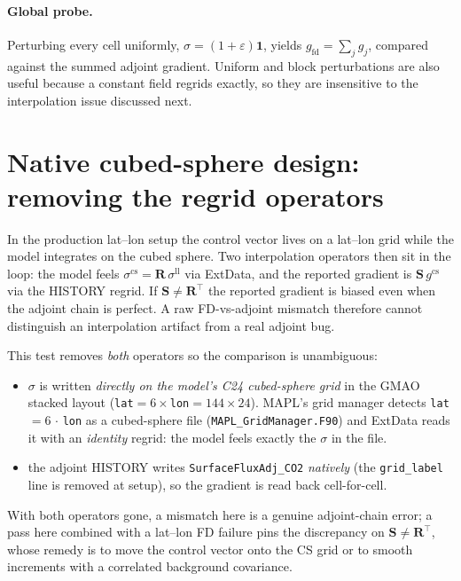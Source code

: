 \documentclass[12pt]{article}
\newcommand{\bm}[1]{\mathbf{#1}}
\newcommand{\gfit}{g_{\mathrm{fd}}}
\newcommand{\Robs}{\bm{R}}
\newcommand{\Sobs}{\bm{S}}
\begin{document}
\paragraph{Global probe.} Perturbing every cell uniformly,
$\sigma = (1+\varepsilon)\bm{1}$, yields $\gfit = \sum_j g_j$, compared against the
summed adjoint gradient. Uniform and block perturbations are also useful because a
constant field regrids exactly, so they are insensitive to the interpolation issue
discussed next.

\section{Native cubed-sphere design: removing the regrid operators}
\label{sec:native}

In the production lat--lon setup the control vector lives on a lat--lon grid while
the model integrates on the cubed sphere. Two interpolation operators then sit in
the loop: the model feels $\sigma^{\mathrm{cs}} = \Robs\,\sigma^{\mathrm{ll}}$ via
ExtData, and the reported gradient is $\Sobs\, g^{\mathrm{cs}}$ via the HISTORY
regrid. If $\Sobs \ne \Robs^{\!\top}$ the reported gradient is biased even when
the adjoint chain is perfect. A raw FD-vs-adjoint mismatch therefore cannot
distinguish an interpolation artifact from a real adjoint bug.

This test removes \emph{both} operators so the comparison is unambiguous:
%
\begin{itemize}
  \item $\sigma$ is written \emph{directly on the model's C24 cubed-sphere grid}
  in the GMAO stacked layout (\texttt{lat}$=6\times$\texttt{lon}$=144\times24$).
  MAPL's grid manager detects \texttt{lat}$=6\,\cdot\,$\texttt{lon} as a
  cubed-sphere file (\texttt{MAPL\_GridManager.F90}) and ExtData reads it with an
  \emph{identity} regrid: the model feels exactly the $\sigma$ in the file.
  \item the adjoint HISTORY writes \texttt{SurfaceFluxAdj\_CO2} \emph{natively}
  (the \texttt{grid\_label} line is removed at setup), so the gradient is read
  back cell-for-cell.
\end{itemize}
%
With both operators gone, a mismatch here is a genuine adjoint-chain error; a pass
here combined with a lat--lon FD failure pins the discrepancy on
$\Sobs\ne\Robs^{\!\top}$, whose remedy is to move the control vector onto the CS
grid or to smooth increments with a correlated background covariance.
\end{document}
